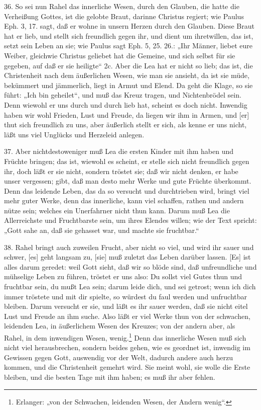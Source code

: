 36. So sei nun Rahel das innerliche Wesen, durch den Glauben, die hatte die Verheißung Gottes, ist die gelobte Braut, darinne Christus regiert; wie Paulus Eph. 3, 17. sagt, daß er wohne in unsern Herzen durch den Glauben. Diese Braut hat er lieb, und stellt sich freundlich gegen ihr, und dient um ihretwillen, das ist, setzt sein Leben an sie; wie Paulus sagt Eph. 5, 25. 26.: „Ihr Männer, liebet eure Weiber, gleichwie Christus geliebet hat die Gemeine, und sich selbst für sie gegeben, auf daß er sie heiligte“ 2c. Aber die Lea hat er nicht so lieb; das ist, die Christenheit nach dem äußerlichen Wesen, wie man sie ansieht, da ist sie müde, bekümmert und jämmerlich, liegt in Armut und Elend. Da geht die Klage, so sie führt: „Ich bin geheilet“, und muß das Kreuz tragen, und Nichtenbrödel sein. Denn wiewohl er uns durch und durch lieb hat, scheint es doch nicht. Inwendig haben wir wohl Frieden, Lust und Freude, da liegen wir ihm in Armen, und [er] thut sich freundlich zu uns, aber äußerlich stellt er sich, als kenne er uns nicht, läßt uns viel Unglücks und Herzeleid anlegen.

37. Aber nichtdestoweniger muß Lea die ersten Kinder mit ihm haben und Früchte bringen; das ist, wiewohl es scheint, er stelle sich nicht freundlich gegen ihr, doch läßt er sie nicht, sondern tröstet sie; daß wir nicht denken, er habe unser vergessen; gibt, daß man desto mehr Werke und gute Früchte überkommt. Denn das leidende Leben, das da so versucht und durchtrieben wird, bringt viel mehr guter Werke, denn das innerliche, kann viel schaffen, rathen und andern nütze sein; welches ein Unerfahrner nicht thun kann. Darum muß Lea die Allerreichste und Fruchtbarste sein, um ihres Elendes willen; wie der Text spricht: „Gott sahe an, daß sie gehasset war, und machte sie fruchtbar.“

38. Rahel bringt auch zuweilen Frucht, aber nicht so viel, und wird ihr sauer und schwer, [es] geht langsam zu, [sie] muß zuletzt das Leben darüber lassen. [Es] ist alles darum geredet: weil Gott sieht, daß wir so blöde sind, daß unfreundliche und mühselige Leben zu führen, tröstet er uns also: Du sollst viel Gutes thun und fruchtbar sein, du mußt Lea sein; darum leide dich, und sei getrost; wenn ich dich immer tröstete und mit dir spielte, so würdest du faul werden und unfruchtbar bleiben. Darum versucht er sie, und läßt es ihr sauer werden, daß sie nicht eitel Lust und Freude an ihm suche. Also läßt er viel Werke thun von der schwachen, leidenden Lea, in äußerlichem Wesen des Kreuzes; von der andern aber, als Rahel, in dem inwendigen Wesen, wenig.\footnote{Erlanger: „von der Schwachen, leidenden Wesen, der Andern wenig“.} Denn das innerliche Wesen muß sich nicht viel herausbrechen, sondern beides gehen, wie es geordnet ist, inwendig im Gewissen gegen Gott, auswendig vor der Welt, dadurch andere auch herzu kommen, und die Christenheit gemehrt wird. Sie meint wohl, sie wolle die Erste bleiben, und die besten Tage mit ihm haben; es muß ihr aber fehlen.

